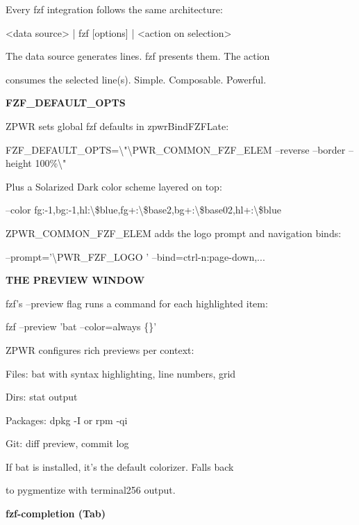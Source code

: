 \documentclass[11pt,a4paper,twoside]{book}
\begin{document}
Every fzf integration follows the same architecture:

<data source> | fzf [options] | <action on selection>

The data source generates lines. fzf presents them. The action

consumes the selected line(s). Simple. Composable. Powerful.


\vspace{12pt}
{\bfseries\color{neonyellow} FZF\_DEFAULT\_OPTS}\vspace{4pt}

ZPWR sets global fzf defaults in zpwrBindFZFLate:

FZF\_DEFAULT\_OPTS=\textbackslash{}"\textbackslash{}PWR\_COMMON\_FZF\_ELEM --reverse --border --height 100\%\textbackslash{}"

Plus a Solarized Dark color scheme layered on top:

--color fg:-1,bg:-1,hl:\textbackslash{}\$blue,fg+:\textbackslash{}\$base2,bg+:\textbackslash{}\$base02,hl+:\textbackslash{}\$blue

ZPWR\_COMMON\_FZF\_ELEM adds the logo prompt and navigation binds:

--prompt='\textbackslash{}PWR\_FZF\_LOGO ' --bind=ctrl-n:page-down,...


\vspace{12pt}
{\bfseries\color{neonyellow} THE PREVIEW WINDOW}\vspace{4pt}

fzf's --preview flag runs a command for each highlighted item:

\begin{codebox}
fzf --preview 'bat --color=always \{\}'\\
\end{codebox}

ZPWR configures rich previews per context:

Files:   bat with syntax highlighting, line numbers, grid

Dirs:    stat output

Packages: dpkg -I or rpm -qi

Git:     diff preview, commit log

If bat is installed, it's the default colorizer. Falls back

to pygmentize with terminal256 output.


\vspace{12pt}
{\bfseries\color{neonyellow} fzf-completion (Tab)}\vspace{4pt}
\end{document}
